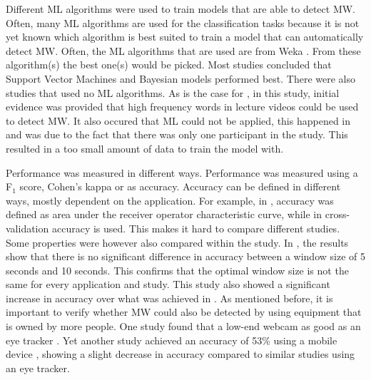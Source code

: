 Different ML algorithms were used to train models that are able to detect MW. Often, many ML algorithms are used for the classification tasks because it is not yet known which algorithm is best suited to train a model that can automatically detect MW. Often, the ML algorithms that are used are from Weka \cite{witten2016data}. From these algorithm(s) the best one(s) would be picked. Most studies concluded that Support Vector Machines and Bayesian models performed best. There were also studies that used no ML algorithms. As is the case for \cite{Jo2017AMind}, in this study, initial evidence was provided that high frequency words in lecture videos could be used to detect MW. It also occured that ML could not be applied, this happened in \cite{Gontier2016HowEnvironment} and was due to the fact that there was only one participant in the study. This resulted in a too small amount of data to train the model with.

Performance was measured in different ways. Performance was measured using a F$_1$ score, Cohen's kappa or as accuracy. Accuracy can be defined in different ways, mostly dependent on the application. For example, in \cite{Cheetham2016AutomatedApplication}, accuracy was defined as area under the receiver operator characteristic curve, while in \cite{Mishchenko2015DetectingTespiti} cross-validation accuracy is used. This makes it hard to compare different studies. Some properties were however also compared within the study. In \cite{Gwizdka2019ExploringTasks}, the results show that there is no significant difference in accuracy between a window size of 5 seconds and 10 seconds. This confirms that the optimal window size is not the same for every application and study. This study also showed a significant increase in accuracy over what was achieved in \cite{Bixler2014TowardWanderingd}. As mentioned before, it is important to verify whether MW could also be detected by using equipment that is owned by more people. One study found that a low-end webcam as good as an eye tracker \cite{Zhao2017ScalableApproach}. Yet another study achieved an accuracy of 53\% using a mobile device \cite{ISI:000443429900018}, showing a slight decrease in accuracy compared to similar studies using an eye tracker.